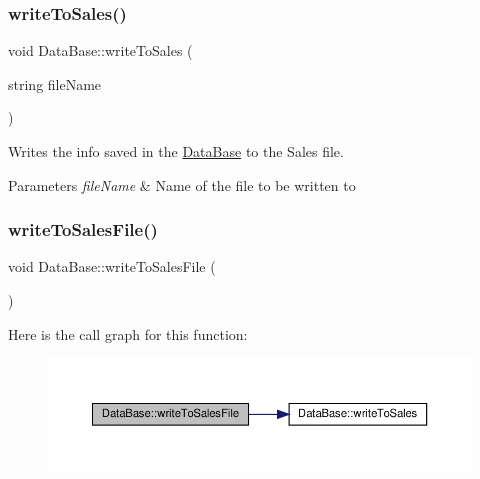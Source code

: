 \subsubsection{\texorpdfstring{write\+To\+Sales()}{writeToSales()}}
{\footnotesize\ttfamily void Data\+Base\+::write\+To\+Sales (\begin{DoxyParamCaption}\item[{string}]{file\+Name }\end{DoxyParamCaption})\hspace{0.3cm}{\ttfamily [inline]}}



Writes the info saved in the \hyperlink{classDataBase}{Data\+Base} to the Sales file. 


\begin{DoxyParams}{Parameters}
{\em file\+Name} & Name of the file to be written to \\
\hline
\end{DoxyParams}
\mbox{\label{classDataBase_a62cb54f7bbcd213d71f604003298cd95}} 
\subsubsection{\texorpdfstring{write\+To\+Sales\+File()}{writeToSalesFile()}}
{\footnotesize\ttfamily void Data\+Base\+::write\+To\+Sales\+File (\begin{DoxyParamCaption}{ }\end{DoxyParamCaption})}

Here is the call graph for this function\+:\nopagebreak
\begin{figure}[H]
\begin{center}
\leavevmode
\includegraphics[width=350pt]{classDataBase_a62cb54f7bbcd213d71f604003298cd95_cgraph}
\end{center}
\end{figure}
\mbox{\label{classDataBase_abc8c8d3116c6b3422d87ae781ba91538}} 
